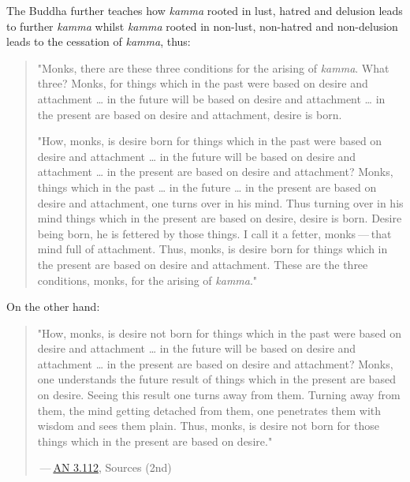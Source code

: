 The Buddha further teaches how \emph{kamma} rooted in lust, hatred and delusion leads to further \emph{kamma} whilst \emph{kamma} rooted in non-lust, non-hatred and non-delusion leads to the cessation of \emph{kamma}, thus:

\begin{quote}
"Monks, there are these three conditions for the arising of \emph{kamma}. What three? Monks, for things which in the past were based on desire and attachment \ldots{} in the future will be based on desire and attachment \ldots{} in the present are based on desire and attachment, desire is born.

"How, monks, is desire born for things which in the past were based on desire and attachment \ldots{} in the future will be based on desire and attachment \ldots{} in the present are based on desire and attachment? Monks, things which in the past \ldots{} in the future \ldots{} in the present are based on desire and attachment, one turns over in his mind. Thus turning over in his mind things which in the present are based on desire, desire is born. Desire being born, he is fettered by those things. I call it a fetter, monks --- that mind full of attachment. Thus, monks, is desire born for things which in the present are based on desire and attachment. These are the three conditions, monks, for the arising of \emph{kamma}."
\end{quote}

On the other hand:

\begin{quote}
"How, monks, is desire not born for things which in the past were based on desire and attachment \ldots{} in the future will be based on desire and attachment \ldots{} in the present are based on desire and attachment? Monks, one understands the future result of things which in the present are based on desire. Seeing this result one turns away from them. Turning away from them, the mind getting detached from them, one penetrates them with wisdom and sees them plain. Thus, monks, is desire not born for those things which in the present are based on desire."

 --- \href{https://suttacentral.net/an3.112/en/sujato}{AN 3.112}, Sources (2nd)
\end{quote}
